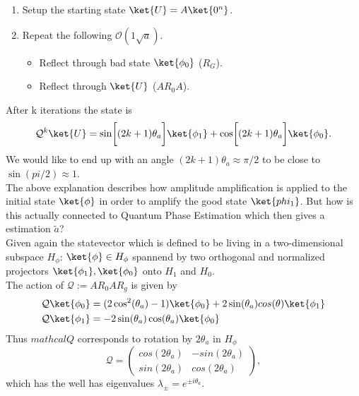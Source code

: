 \documentclass[../../main.tex]{subfiles}
\begin{document}
\begin{enumerate}
  \item{Setup the starting state $\ket{U} = A\ket{0^n}$}.
  \item{Repeat the following $\mathcal{O}(1 \sqrt{a})$}.
  \begin{itemize}
    \item Reflect through bad state $\ket{\phi_0}$ ($R_G$).
    \item Reflect through $\ket{U}$ ($AR_0A$).
  \end{itemize}
\end{enumerate}
After k iterations the state is 
\begin{equation}\label{eq:Qktimes}
\mathcal{Q}^k \ket{U} = \sin \biggl[ (2k+1)\theta_a \biggr] \ket{\phi_1} + \cos \biggl[ (2k+1)\theta_a \biggr] \ket{\phi_0}.
\end{equation}
We would like to end up with an angle $(2k+1)\theta_a \approx \pi/2$ to be close to $\sin(pi/2) \approx 1$.\\
The above explanation describes how amplitude amplification is applied to the initial state $\ket{\phi}$ in order to amplify the good state $\ket{phi_1}$.
But how is this actually connected to Quantum Phase Estimation which then gives a estimation $\tilde{a}$?\\
Given again the statevector which is defined to be living in a two-dimensional subspace $H_{\phi}$: $\ket{\phi} \in H_{\phi}$ spannend by two orthogonal and normalized
projectors $\ket{\phi_1}, \ket{\phi_0}$ onto $H_1$ and $H_0$.\\
The action of $\mathcal{Q} := AR_0AR_g$ is given by
\begin{align}\label{eq:actionOfQ}
  \mathcal{Q} \ket{\phi_0} &= (2 \cos^2(\theta_a) - 1 )\ket{\phi_0} + 2 \sin(\theta_a)cos(\theta) \ket{\phi_1}\\
  \mathcal{Q} \ket{\phi_1} &= -2 \sin(\theta_a) \cos(\theta_a) \ket{\phi_0} 
\end{align}
Thus $mathcal{Q}$ corresponds to rotation by $2\theta_a$ in $H_\phi$
\begin{equation}\label{eq:rotationMatrix}
  \mathcal{Q} = 
\begin{pmatrix}
      cos(2\theta_a) & -sin(2 \theta_a) \\
      sin(2\theta_a) & cos(2 \theta_a) 
\end{pmatrix},
\end{equation}
which has the well has eigenvalues $\lambda_{\pm} = e^{\pm i \theta_a}$.\\
\end{document}
